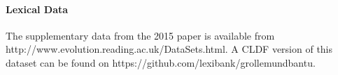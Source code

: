 \documentclass[a4paper,12pt]{scrartcl}
\begin{document}
\paragraph{Lexical Data}
The supplementary data from the 2015 paper is available from
http://www.evolution.reading.ac.uk/DataSets.html. A CLDF version of this dataset
can be found on https://github.com/lexibank/grollemundbantu.
\end{document}
